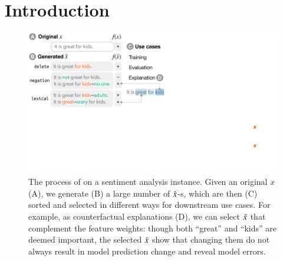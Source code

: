 \section{Introduction}
\label{sec:intro}

\begin{figure}[t]
\centering
\includegraphics[trim={0 18cm 30.5cm 0cm},clip, width=1\columnwidth]{figures/teaser}
\vspace{-15pt}
\caption{
The process of \sysname on a sentiment analysis instance.
Given an original $x$ (A), we generate (B) a large number of $\hat{x}$-s, which are then (C) sorted and selected in different ways for downstream use cases.
For example, as counterfactual explanations (D), we can select $\hat{x}$ that complement the feature weights:  though both ``great'' and ``kids'' are deemed important, the selected $\hat{x}$ show that changing them do not always result in model prediction change and reveal model errors.
}
\vspace{-15pt}
\label{fig:teaser}
\end{figure} 
 

